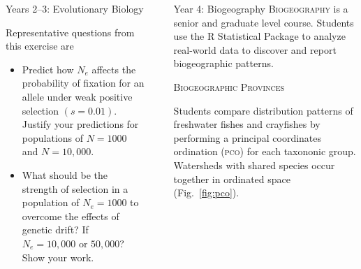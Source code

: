 \documentclass[final,hyperref={pdfpagelabels=false}]{beamer}
\newcommand{\whitespace}{\vspace{0.5\baselineskip}}
\newlength{\sepwid}
\newlength{\onecolwid}
\begin{document}
\begin{frame}[t]
\begin{columns}[t]
\begin{column}{\onecolwid}
\begin{block}{Years 2–3: Evolutionary Biology}
       		\vspace*{0.8\baselineskip}
       		
       		Representative questions from this exercise are
       		\begin{itemize}\justifying
       			
       			\item Predict how $N_e$ affects the probability of fixation for an allele under weak positive selection $\left(s = 0.01\right)$. Justify your predictions for populations of $N = 1000$ and $N = 10,000$.
       			
       			\item What should be the strength of selection in a population of $N_e = 1000$ to overcome the effects of genetic drift? If $N_e = 10,000$ or $50,000$? Show your work.
       		\end{itemize}
       		
		\end{block}
	\end{column}

	\begin{column}{\sepwid}
	\end{column}

	\begin{column}{\onecolwid}
  	  	\begin{block}{Year 4: Biogeography}
			\textsc{Biogeography} is a senior and graduate level course. Students use the R Statistical Package \citep{R-Core-Team:2016aa} to analyze real-world data to discover and report biogeographic patterns.
			
       		\whitespace
       		
			\textcolor{cardiac}{\textsc{Biogeographic Provinces}}

			Students compare distribution patterns of freshwater fishes and crayfishes by performing a principal coordinates ordination (\textsc{pco}) for each taxononic group. Watersheds with shared species occur together in ordinated space (Fig.~\ref{fig:pco}).
		

\end{block}
\end{column}
\end{columns}
\end{frame}
\end{document}
